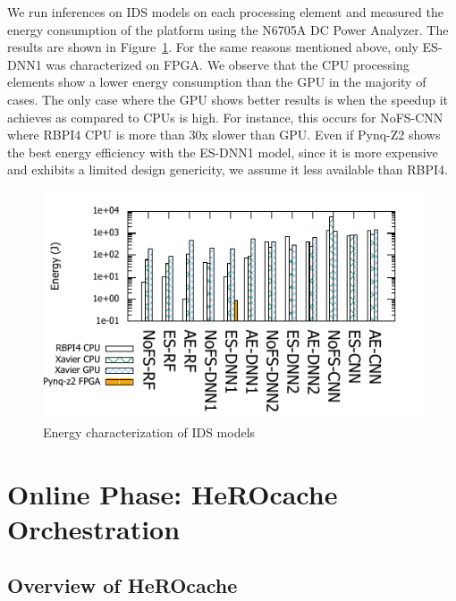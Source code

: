 We run inferences on IDS models on each processing element and measured the energy consumption of the platform using the N6705A DC Power Analyzer. The results are shown in Figure~\ref{figure:herocache-energy}. For the same reasons mentioned above, only ES-DNN1 was characterized on FPGA. %
We observe that the CPU processing elements show a lower energy consumption than the GPU in the majority of cases. The only case where the GPU shows better results is when the speedup it achieves as compared to CPUs is high. For instance, this occurs for NoFS-CNN where RBPI4 CPU is more than 30x slower than GPU.  
Even if Pynq-Z2 shows the best energy efficiency with the ES-DNN1 model, since it is more expensive and exhibits a limited design genericity, we assume it less available than RBPI4.

\begin{figure}
    \centering
    \includegraphics[width=0.9\columnwidth]{6_Chapitre4/figures/energy_bar.pdf}
    \caption{Energy characterization of IDS models}
    \label{figure:herocache-energy}
\end{figure}

\section{Online Phase: HeROcache Orchestration} \label{section:herocache-contribution}

\subsection{Overview of HeROcache}

